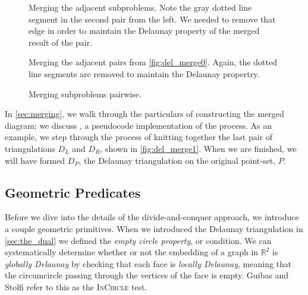 \documentclass[12pt,twoside]{reedthesis}
\begin{document}
    \begin{figure}[!htb]
    \centering
      \begin{subtable}{\textwidth}
        \centering
        
        \caption{Merging the adjacent subproblems. Note the gray dotted line segment in the second pair from the left. We needed to remove that edge in order to maintain the Delaunay property of the merged result of the pair.}
        \label{fig:del_merge0}
      \end{subtable}

      \centering
      \begin{subtable}{\textwidth}
        \centering
        
        \caption{Merging the adjacent pairs from \cref{fig:del_merge0}. Again, the dotted line segments are removed to maintain the Delaunay propertry.}
        \label{fig:del_merge1}
      \end{subtable}
      \caption{Merging subproblems pairwise.}
      \label{fig:del_merge_not_final}
    \end{figure}


    In \cref{sec:merging}, we walk through the particulars of constructing the merged diagram; we discuss , a pseudocode implementation of the process. As an example, we step through the process of knitting together the last pair of triangulations $D_{L}$ and $D_{R}$, shown in \cref{fig:del_merge1}. When we are finished, we will have formed $D_{P}$, the Delaunay triangulation on the original point-set, $P$.\par 
    \clearpage
    \subsection{Geometric Predicates}
    \label{sub:geo_pred}
      Before we dive into the details of the divide-and-conquer approach, we introduce a couple geometric primitives. When we introduced the Delaunay triangulation in \cref{sec:the_dual} we defined the \emph{empty circle property}, or condition. We can systematically determine whether or not the embedding of a graph in $\mathds{R}^2$ is \emph{globally Delaunay} by checking that each face is \emph{locally Delaunay}, meaning that the circumcircle passing through the vertices of the face is empty. Guibas and Stolfi refer to this as the \textsc{InCircle} test.\par
\end{document}
